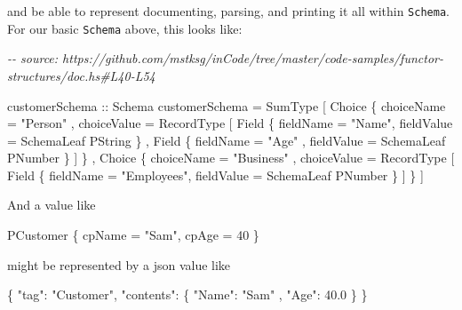 \documentclass[]{article}
\newenvironment{Shaded}{}{}
\newcommand{\CommentTok}[1]{\textcolor[rgb]{0.38,0.63,0.69}{\textit{#1}}}
\newcommand{\DataTypeTok}[1]{\textcolor[rgb]{0.56,0.13,0.00}{#1}}
\newcommand{\DecValTok}[1]{\textcolor[rgb]{0.25,0.63,0.44}{#1}}
\newcommand{\FloatTok}[1]{\textcolor[rgb]{0.25,0.63,0.44}{#1}}
\newcommand{\FunctionTok}[1]{\textcolor[rgb]{0.02,0.16,0.49}{#1}}
\newcommand{\NormalTok}[1]{#1}
\newcommand{\OtherTok}[1]{\textcolor[rgb]{0.00,0.44,0.13}{#1}}
\newcommand{\StringTok}[1]{\textcolor[rgb]{0.25,0.44,0.63}{#1}}
\begin{document}
and be able to represent documenting, parsing, and printing it all within
\texttt{Schema}. For our basic \texttt{Schema} above, this looks like:

\begin{Shaded}
\begin{Highlighting}[]
\CommentTok{{-}{-} source: https://github.com/mstksg/inCode/tree/master/code{-}samples/functor{-}structures/doc.hs\#L40{-}L54}

\OtherTok{customerSchema ::} \DataTypeTok{Schema}
\NormalTok{customerSchema }\OtherTok{=} \DataTypeTok{SumType}
\NormalTok{    [ }\DataTypeTok{Choice}
\NormalTok{        \{ choiceName  }\OtherTok{=} \StringTok{"Person"}
\NormalTok{        , choiceValue }\OtherTok{=} \DataTypeTok{RecordType}
\NormalTok{            [ }\DataTypeTok{Field}\NormalTok{ \{ fieldName }\OtherTok{=} \StringTok{"Name"}\NormalTok{, fieldValue }\OtherTok{=} \DataTypeTok{SchemaLeaf} \DataTypeTok{PString}\NormalTok{ \}}
\NormalTok{            , }\DataTypeTok{Field}\NormalTok{ \{ fieldName }\OtherTok{=} \StringTok{"Age"}\NormalTok{ , fieldValue }\OtherTok{=} \DataTypeTok{SchemaLeaf} \DataTypeTok{PNumber}\NormalTok{ \}}
\NormalTok{            ]}
\NormalTok{        \}}
\NormalTok{    , }\DataTypeTok{Choice}
\NormalTok{        \{ choiceName  }\OtherTok{=} \StringTok{"Business"}
\NormalTok{        , choiceValue }\OtherTok{=} \DataTypeTok{RecordType}
\NormalTok{            [ }\DataTypeTok{Field}\NormalTok{ \{ fieldName }\OtherTok{=} \StringTok{"Employees"}\NormalTok{, fieldValue }\OtherTok{=} \DataTypeTok{SchemaLeaf} \DataTypeTok{PNumber}\NormalTok{ \} ]}
\NormalTok{        \}}
\NormalTok{    ]}
\end{Highlighting}
\end{Shaded}

And a value like

\begin{Shaded}
\begin{Highlighting}[]
\DataTypeTok{PCustomer}\NormalTok{ \{ cpName }\OtherTok{=} \StringTok{"Sam"}\NormalTok{, cpAge }\OtherTok{=} \DecValTok{40}\NormalTok{ \}}
\end{Highlighting}
\end{Shaded}

might be represented by a json value like

\begin{Shaded}
\begin{Highlighting}[]
\FunctionTok{\{} \DataTypeTok{"tag"}\FunctionTok{:} \StringTok{"Customer"}\FunctionTok{,}
  \DataTypeTok{"contents"}\FunctionTok{:}
    \FunctionTok{\{} \DataTypeTok{"Name"}\FunctionTok{:} \StringTok{"Sam"}
    \FunctionTok{,} \DataTypeTok{"Age"}\FunctionTok{:} \FloatTok{40.0}
    \FunctionTok{\}}
\FunctionTok{\}}
\end{Highlighting}
\end{Shaded}
\end{document}

